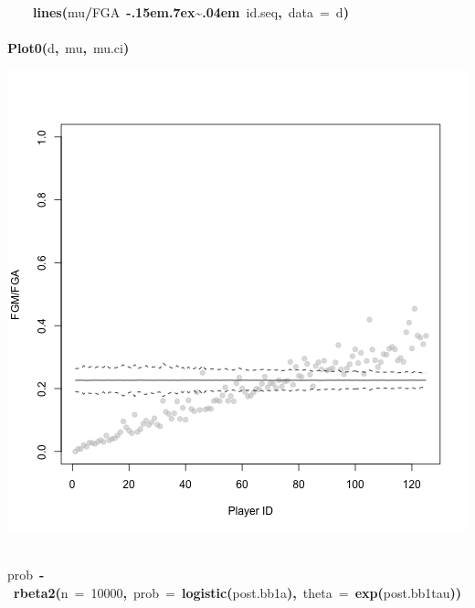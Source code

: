 \documentclass{article}
\makeatletter
\newcommand{\hlnumber}[1]{\textcolor[rgb]{0,0,0}{#1}}%
\newcommand{\hlfunctioncall}[1]{\textcolor[rgb]{.5,0,.33}{\textbf{#1}}}%
\newcommand{\hlkeyword}[1]{\textbf{#1}}%
\newcommand{\hlargument}[1]{\textcolor[rgb]{.69,.25,.02}{#1}}%
\newcommand{\hlassignement}[1]{\textbf{#1}}%
\newcommand{\hlsymbol}[1]{#1}%
\def\urltilda{\kern -.15em\lower .7ex\hbox{\~{}}\kern .04em}%
\newcommand{\hlstd}[1]{\textcolor[rgb]{0,0,0}{#1}}%
\newenvironment{kframe}{%
 \def\FrameCommand##1{\hskip\@totalleftmargin \hskip-\fboxsep
 \colorbox{shadecolor}{##1}\hskip-\fboxsep
     \hskip-\linewidth \hskip-\@totalleftmargin \hskip\columnwidth}%
 \MakeFramed {\advance\hsize-\width
   \@totalleftmargin\z@ \linewidth\hsize
   \@setminipage}}%
 {\par\unskip\endMakeFramed}
\newenvironment{knitrout}{}{} %
\makeatother
\begin{document}
\begin{knitrout}
{\begin{kframe}
\begin{flushleft}
\hlstd{}{\ }{\ }{\ }{\ }\hlfunctioncall{lines}\hlkeyword{(}\hlsymbol{mu}\hlkeyword{/}\hlsymbol{FGA}{\ }\hlkeyword{\urltilda{}}{\ }\hlsymbol{id.seq}\hlkeyword{,}{\ }\hlargument{data}{\ }\hlargument{=}{\ }\hlsymbol{d}\hlkeyword{)}\hspace*{\fill}\\
\hlstd{}\hlkeyword{\usebox{\hlnormalsizeboxclosebrace}}\hspace*{\fill}\\
\hlstd{}\hlfunctioncall{Plot0}\hlkeyword{(}\hlsymbol{d}\hlkeyword{,}{\ }\hlsymbol{mu}\hlkeyword{,}{\ }\hlsymbol{mu.ci}\hlkeyword{)}\mbox{}
\normalfont
\end{flushleft}
\includegraphics{post-bs1} \begin{flushleft}
\ttfamily\noindent
\hspace*{\fill}\\
\hlstd{}\hlsymbol{prob}{\ }\hlassignement{\usebox{\hlnormalsizeboxlessthan}-}{\ }\hlfunctioncall{rbeta2}\hlkeyword{(}\hlargument{n}{\ }\hlargument{=}{\ }\hlnumber{10000}\hlkeyword{,}{\ }\hlargument{prob}{\ }\hlargument{=}{\ }\hlfunctioncall{logistic}\hlkeyword{(}\hlsymbol{post.bb1}\hlkeyword{\usebox{\hlnormalsizeboxdollar}}\hlsymbol{a}\hlkeyword{)}\hlkeyword{,}{\ }\hlargument{theta}{\ }\hlargument{=}{\ }\hlfunctioncall{exp}\hlkeyword{(}\hlsymbol{post.bb1}\hlkeyword{\usebox{\hlnormalsizeboxdollar}}\hlsymbol{tau}\hlkeyword{)}\hlkeyword{)}\hspace*{\fill}\\

\end{flushleft}
\end{kframe}}
\end{knitrout}
\end{document}
